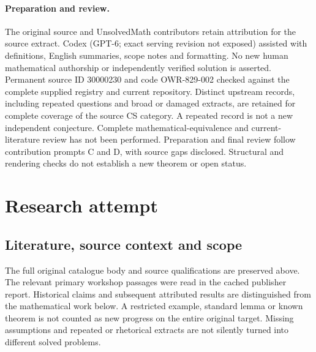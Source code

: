 \documentclass[11pt]{article}
\begin{document}
\paragraph{Preparation and review.}
The original source and UnsolvedMath contributors retain attribution for the source extract. Codex (GPT-6; exact serving revision not exposed) assisted with definitions, English summaries, scope notes and formatting. No new human mathematical authorship or independently verified solution is asserted. Permanent source ID 30000230 and code OWR-829-002 checked against the complete supplied registry and current repository. Distinct upstream records, including repeated questions and broad or damaged extracts, are retained for complete coverage of the source CS category. A repeated record is not a new independent conjecture. Complete mathematical-equivalence and current-literature review has not been performed. Preparation and final review follow contribution prompts C and D, with source gaps disclosed. Structural and rendering checks do not establish a new theorem or open status.
\label{end:30000230}

\section{Research attempt}
\subsection{Literature, source context and scope}
The full original catalogue body and source qualifications are preserved above. The relevant primary workshop passages were read in the cached publisher report. Historical claims and subsequent attributed results are distinguished from the mathematical work below. A restricted example, standard lemma or known theorem is not counted as new progress on the entire original target. Missing assumptions and repeated or rhetorical extracts are not silently turned into different solved problems.
\end{document}
